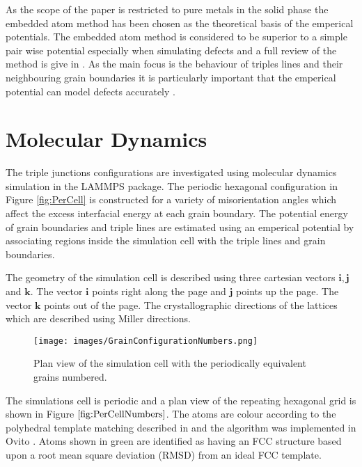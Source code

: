 \documentclass[12pt,a4paper]{book}
\begin{document}
As the scope of the paper is restricted to pure metals in the solid phase the embedded atom method has been chosen as the theoretical basis of the emperical potentials. The embedded atom method is considered to be superior to a simple pair wise potential especially when simulating defects and a full review of the method is give in \cite{Daw1993}. As the main focus is the behaviour of triples lines and their neighbouring grain boundaries it is particularly important that the emperical potential can model defects accurately . 


 

\chapter{Molecular Dynamics}

The triple junctions configurations are investigated using molecular dynamics simulation in the LAMMPS package. The periodic hexagonal configuration in Figure \ref{fig:PerCell} is constructed for a variety of misorientation angles which affect the excess interfacial energy at each grain boundary. The potential energy of grain boundaries and triple lines are estimated using an emperical potential by associating regions inside the simulation cell with the triple lines and grain boundaries. 

The geometry of the simulation cell is described using three cartesian vectors $\mathbf{i}, \mathbf{j}$ and $\mathbf{k}$. The vector $\mathbf{i}$ points right along the page and $\mathbf{j}$  points up the page. The vector $\mathbf{k}$ points out of the page. The crystallographic directions of the lattices which are described using Miller directions.

\begin{figure}
	\texttt{[image: images/GrainConfigurationNumbers.png]}
	\caption{Plan view of the simulation cell with the periodically equivalent grains numbered.}
	\label{fig:PerCellNumbers} 
\end{figure}

The simulations cell is periodic and a plan view of the repeating hexagonal grid is shown in Figure $\ref{fig:PerCellNumbers}$. The atoms are colour according to the polyhedral template matching described in \cite{Larsen_2016} and the algorithm  was implemented in Ovito \cite{Stukowski2009}. Atoms shown in green are identified as having an FCC structure based upon a root mean square deviation (RMSD) from an ideal FCC template. 
\end{document}
